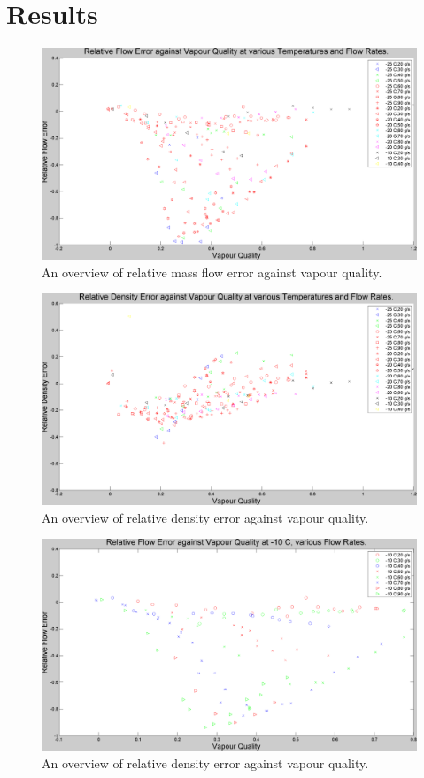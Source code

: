 \documentclass{report}
\begin{document}
\chapter{Results} \label{results}
\begin{figure}
\includegraphics[width=\textwidth]{plots/fig1}
\caption{An overview of relative mass flow error against vapour quality.}
\label{plot:1}
\end{figure}
\begin{figure}
\includegraphics[width=\textwidth]{plots/fig2}
\caption{An overview of relative density error against vapour quality.}
\label{plot:2}
\end{figure}


\begin{figure}
\includegraphics[width=\textwidth]{plots/fig3}
\caption{An overview of relative density error against vapour quality.}
\label{plot:3}
\end{figure}
\end{document}
